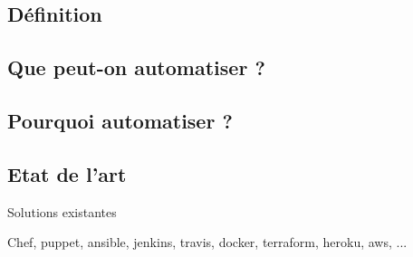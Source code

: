 
\subsection{Définition}

\subsection{Que peut-on automatiser ?}

\subsection{Pourquoi automatiser ?}

\subsection{Etat de l'art}

Solutions existantes

Chef, puppet, ansible, jenkins, travis, docker, terraform, heroku, aws, ...
